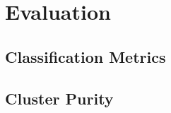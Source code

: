 \chapter{Evaluation}\label{chap:evaluation}
\section{Classification Metrics}
\section{Cluster Purity}